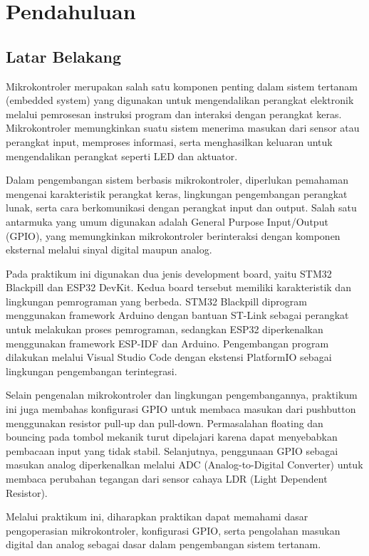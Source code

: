\section{Pendahuluan}
\subsection{Latar Belakang}
Mikrokontroler merupakan salah satu komponen penting dalam sistem tertanam (embedded system) yang digunakan untuk mengendalikan perangkat elektronik melalui pemrosesan instruksi program dan interaksi dengan perangkat keras. Mikrokontroler memungkinkan suatu sistem menerima masukan dari sensor atau perangkat input, memproses informasi, serta menghasilkan keluaran untuk mengendalikan perangkat seperti LED dan aktuator.

Dalam pengembangan sistem berbasis mikrokontroler, diperlukan pemahaman mengenai karakteristik perangkat keras, lingkungan pengembangan perangkat lunak, serta cara berkomunikasi dengan perangkat input dan output. Salah satu antarmuka yang umum digunakan adalah General Purpose Input/Output (GPIO), yang memungkinkan mikrokontroler berinteraksi dengan komponen eksternal melalui sinyal digital maupun analog.

Pada praktikum ini digunakan dua jenis development board, yaitu STM32 Blackpill dan ESP32 DevKit. Kedua board tersebut memiliki karakteristik dan lingkungan pemrograman yang berbeda. STM32 Blackpill diprogram menggunakan framework Arduino dengan bantuan ST-Link sebagai perangkat untuk melakukan proses pemrograman, sedangkan ESP32 diperkenalkan menggunakan framework ESP-IDF dan Arduino. Pengembangan program dilakukan melalui Visual Studio Code dengan ekstensi PlatformIO sebagai lingkungan pengembangan terintegrasi.

Selain pengenalan mikrokontroler dan lingkungan pengembangannya, praktikum ini juga membahas konfigurasi GPIO untuk membaca masukan dari pushbutton menggunakan resistor pull-up dan pull-down. Permasalahan floating dan bouncing pada tombol mekanik turut dipelajari karena dapat menyebabkan pembacaan input yang tidak stabil. Selanjutnya, penggunaan GPIO sebagai masukan analog diperkenalkan melalui ADC (Analog-to-Digital Converter) untuk membaca perubahan tegangan dari sensor cahaya LDR (Light Dependent Resistor).

Melalui praktikum ini, diharapkan praktikan dapat memahami dasar pengoperasian mikrokontroler, konfigurasi GPIO, serta pengolahan masukan digital dan analog sebagai dasar dalam pengembangan sistem tertanam.

